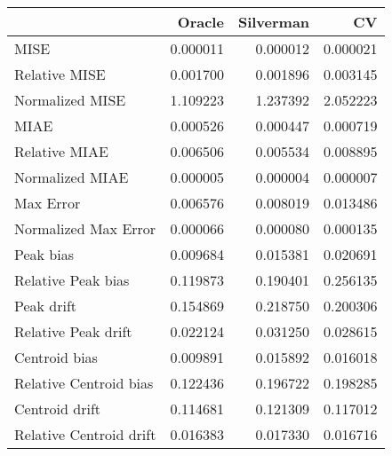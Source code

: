 \begin{tabular}{lrrr}
  \hline
 & Oracle & Silverman & CV \\ 
  \hline
MISE & 0.000011 & 0.000012 & 0.000021 \\ 
  Relative MISE & 0.001700 & 0.001896 & 0.003145 \\ 
  Normalized MISE & 1.109223 & 1.237392 & 2.052223 \\ 
  MIAE & 0.000526 & 0.000447 & 0.000719 \\ 
  Relative MIAE & 0.006506 & 0.005534 & 0.008895 \\ 
  Normalized MIAE & 0.000005 & 0.000004 & 0.000007 \\ 
  Max Error & 0.006576 & 0.008019 & 0.013486 \\ 
  Normalized Max Error & 0.000066 & 0.000080 & 0.000135 \\ 
  Peak bias & 0.009684 & 0.015381 & 0.020691 \\ 
  Relative Peak bias & 0.119873 & 0.190401 & 0.256135 \\ 
  Peak drift & 0.154869 & 0.218750 & 0.200306 \\ 
  Relative Peak drift & 0.022124 & 0.031250 & 0.028615 \\ 
  Centroid bias & 0.009891 & 0.015892 & 0.016018 \\ 
  Relative Centroid bias & 0.122436 & 0.196722 & 0.198285 \\ 
  Centroid drift & 0.114681 & 0.121309 & 0.117012 \\ 
  Relative Centroid drift & 0.016383 & 0.017330 & 0.016716 \\ 
   \hline
\end{tabular}
